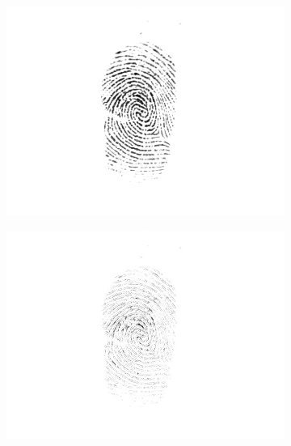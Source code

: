 \documentclass{beamer}
\begin{document}
{\begin{figure}[!ht]
\begin{subfigure}[ht]{0.15\textwidth}
            \includegraphics[width=\textwidth]{fingerprints/2004Db1a/1_2_src.jpg}
        \end{subfigure}
        \qquad
        \begin{subfigure}[ht]{0.15\textwidth}
            \includegraphics[width=\textwidth]{fingerprints/2004Db1a/1_2_background.jpg}
        \end{subfigure}
        \qquad
        \begin{subfigure}[ht]{0.15\textwidth}

\end{subfigure}
\end{figure}}
\end{document}

